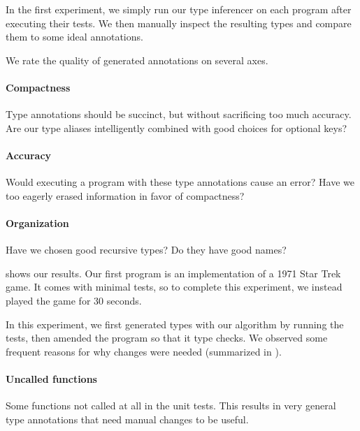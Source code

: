 
In the first experiment, we simply run our 
type inferencer on each program after executing
their tests.
We then manually inspect the resulting
types and compare them to some ideal
annotations.

We rate the quality of generated annotations
on several axes.

\paragraph{Compactness} Type annotations should be succinct,
        but without sacrificing too much accuracy.
        Are our type aliases intelligently combined
        with good choices for optional keys?

  \paragraph{Accuracy} Would executing a program with these
      type annotations cause an error?
      Have we too eagerly erased information in favor
      of compactness?

  \paragraph{Organization} Have we chosen good recursive types?
      Do they have good names?


 shows our results.
Our first program is an implementation of a
1971 Star Trek game.
It comes with minimal tests, so to complete this experiment,
we instead played the game for 30 seconds.


In this experiment, we first generated types with our algorithm
by running the tests, then amended the program so that it
type checks.
We observed some frequent reasons for why changes were needed
(summarized in ).

\paragraph{Uncalled functions}
Some functions not called at all in the unit tests.
This results in very general type annotations that need
manual changes to be useful.

